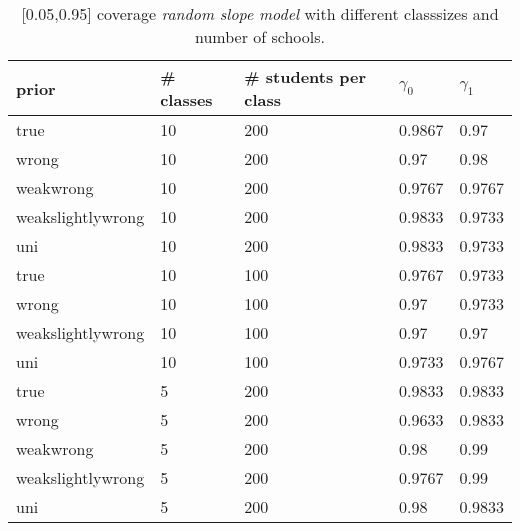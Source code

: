 \begin{table}[!ht]
\begin{center}
\begin{tabular}{l l l l  l}
prior & \# classes & \#  students per class &  $\gamma_0$ & $ \gamma_1$ \\
\hline
\hline
true & 10  &  200  &  0.9867  &  0.97\\
wrong & 10  &  200  &  0.97  &  0.98\\
weakwrong & 10  &  200  &  0.9767  &  0.9767\\
weakslightlywrong & 10  &  200  &  0.9833  &  0.9733\\
uni & 10  &  200  &  0.9833  &  0.9733\\
\hline
true &10  &  100  &  0.9767  &  0.9733\\
wrong& 10  &  100  &  0.97  &  0.9733\\
weakslightlywrong &10  &  100  &  0.97  &  0.97\\
uni &10  &  100  &  0.9733  &  0.9767\\ 
\hline
true & 5  &  200  &  0.9833  &  0.9833\\
wrong & 5  &  200  &  0.9633  &  0.9833\\
weakwrong & 5  &  200  &  0.98  &  0.99\\
weakslightlywrong &5  &  200  &  0.9767  &  0.99\\
uni &5  &  200  &  0.98  &  0.9833\\
\end{tabular}
\end{center}
\caption{[0.05,0.95] coverage \emph{random slope model}  with different classsizes and number of schools. }
\label{tab:relational_table}
\end{table}

